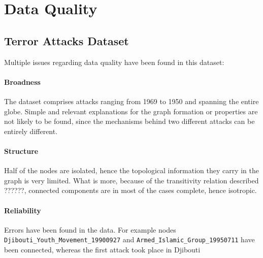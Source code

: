 \section{Data Quality}
\label{sec:DataQuality}

\subsection{Terror Attacks Dataset}
Multiple issues regarding data quality have been found in this dataset:

\paragraph{Broadness} The dataset comprises attacks ranging from 1969 to 1950 and spanning the entire globe. Simple and relevant explanations for the graph formation or properties are not likely to be found, since the mechanisms behind two different attacks can be entirely different.

\paragraph{Structure} Half of the nodes are isolated, hence the topological information they carry in the graph is very limited. What is more, because of the transitivity relation described ??????, connected components are in most of the cases complete, hence isotropic. 

\paragraph{Reliability} Errors have been found in the data. For example nodes \texttt{Djibouti\_Youth\_Movement\_19900927} and \texttt{Armed\_Islamic\_Group\_19950711} have been connected, whereas the first attack took place in Djibouti~\cite{amnesty1991}
